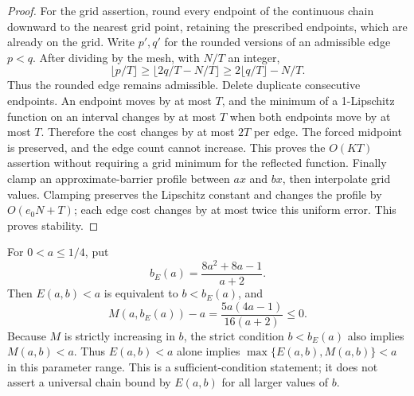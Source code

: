 \begin{proof}
For the grid assertion, round every endpoint of the continuous chain downward
to the nearest grid point, retaining the prescribed endpoints, which are already
on the grid. Write \(p',q'\) for the rounded versions of an admissible edge
\(p<q\). After dividing by the mesh, with \(N/T\) an integer,
$$
 \lfloor p/T\rfloor\geq\lfloor 2q/T-N/T\rfloor
 \geq 2\lfloor q/T\rfloor-N/T.
$$
Thus the rounded edge remains admissible. Delete duplicate consecutive endpoints.
An endpoint moves by at most \(T\), and the minimum of a 1-Lipschitz function
on an interval changes by at most \(T\) when both endpoints move by at most
\(T\). Therefore the cost changes by at most \(2T\) per edge. The forced
midpoint is preserved, and the edge count cannot increase. This proves the
\(O(KT)\) assertion without requiring a grid minimum for the reflected function.
Finally clamp an approximate-barrier profile
between \(ax\) and \(bx\), then interpolate grid values. Clamping preserves
the Lipschitz constant and changes the profile by \(O(e_0N+T)\); each edge
cost changes by at most twice this uniform error. This proves stability.
\end{proof}

\begin{remark}\label{fprof:reflectionregion}
For \(0<a\leq1/4\), put
$$
 b_E(a)=\frac{8a^2+8a-1}{a+2}.
$$
Then \(E(a,b)<a\) is equivalent to \(b<b_E(a)\), and
$$
 M(a,b_E(a))-a=\frac{5a(4a-1)}{16(a+2)}\leq0.
$$
Because \(M\) is strictly increasing in \(b\), the strict condition
\(b<b_E(a)\) also implies \(M(a,b)<a\).
Thus \(E(a,b)<a\) alone implies
\(\max\{E(a,b),M(a,b)\}<a\) in this parameter range.
This is a sufficient-condition statement; it does not assert a universal
chain bound by \(E(a,b)\) for all larger values of \(b\).
\end{remark}
